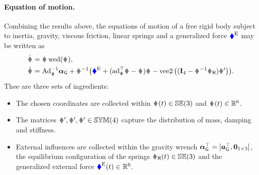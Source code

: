 \paragraph{Equation of motion.}
Combining the results above, the equations of motion of a free rigid body subject to inertia, gravity, viscous friction, linear springs and a generalized force $\boldsymbol{\textcolor{blue}{\blacklozenge}}^{\mathrm{E}}$ may be written as
\begin{subequations}
\begin{align}
 \dot{\G} &= \G \wedOp(\bodyVel{}{}),
\\
 \bodyVeld{}{} &= \Ad{\G}^{-1} \gravityAccWrench + \bodyInertiaMat{}{}^{-1}\big(\genForceEx + (\ad{\bodyVel{}{}}^\top \bodyInertiaMat{}{} - \bodyDissMat{}{}) \bodyVel{}{} - \veeTwoOp \big( (\idMat[4] - \bodyHomoCoord{}{}^{-1} \bodyHomoCoordR{}{}) \bodyStiffMatp{}{} \big) \big).
\end{align} 
\end{subequations}
Thee are three sets of ingredients:
\begin{itemize}
\item The chosen coordinates are collected within $\bodyHomoCoord{}{}(t)\in\SpecialEuclideanGroup(3)$ and $\bodyVel{}{}(t)\in\RealNum^6$.
\item The matrices $\bodyInertiaMatp{}{}, \bodyDissMatp{}{}, \bodyStiffMatp{}{} \in \SymMat(4)$ capture the distribution of mass, damping and stiffness.
\item External influences are collected within the gravity wrench $\boldsymbol{\alpha}_{\mathsf{G}}^\top = [ \boldsymbol{a}_{\mathsf{G}}^\top, \boldsymbol{0}_{1\times3} ]$, the equilibrium configuration of the springs $\bodyHomoCoordR{}{}(t) \in \SpecialEuclideanGroup(3)$ and the generalized external force $\boldsymbol{\textcolor{blue}{\blacklozenge}}^{\mathrm{E}}(t)\in\mathbb{R}^6$.
\end{itemize}
